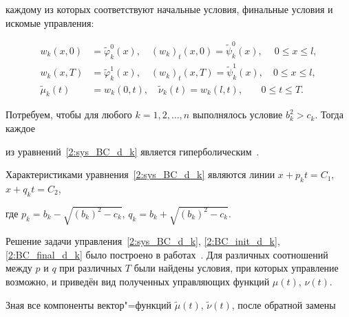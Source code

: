 каждому из которых соответствуют начальные условия, финальные условия и искомые управления:

\begin{align}

\label{2:BC_init_d_k}

w_k(x,0)&=\tilde{\varphi}_k^0(x),\quad (w_k)_t(x,0)=\tilde{\psi}_k^0(x),\quad ~0\leq{x}\leq{l},\\



\label{2:BC_final_d_k}

w_k(x,T)&=\tilde{\varphi}_k^1(x),\quad (w_k)_t(x,T)=\tilde{\psi}_k^1(x), \quad 0\leq{x}\leq{l},\\



\tilde{\mu}_k(t)&=w_k(0,t),\quad \tilde{\nu}_k(t)=w_k(l,t), \quad  ~~~~0\leq{t}\leq{T}.

\end{align}



Потребуем, чтобы для любого $k={1, 2, \dots, n}$ выполнялось условие $b_k^2>c_k$. Тогда каждое

из уравнений~\eqref{2:sys_BC_d_k} является гиперболическим~\cite{kozlova:bib:Bitsadze}.

Характеристиками уравнения~\eqref{2:sys_BC_d_k} являются линии $x+p_kt=C_1$, $x+q_kt=C_2$,

где $p_k=b_k-\sqrt{(b_k)^2-c_k}$, $q_k=b_k+\sqrt{(b_k)^2-c_k}$. %



Решение задачи управления~\eqref{2:sys_BC_d_k}, \eqref{2:BC_init_d_k}, \eqref{2:BC_final_d_k} было построено в работах~\cite{kozlova:bib:Kozlova1,kozlova:bib:Kozlova2}. Для различных соотношений между $p$ и $q$ при различных  $T$ были найдены условия, при которых управление возможно, и приведён вид полученных управляющих функций $\mu(t)$, $\nu(t)$.


Зная все компоненты вектор"=функций $\tilde{\mu}(t)$, $\tilde{\nu}(t)$, после обратной замены

